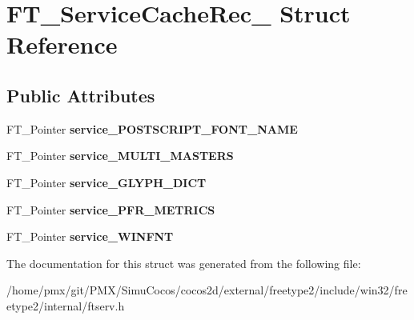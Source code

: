 \hypertarget{structFT__ServiceCacheRec__}{}\section{F\+T\+\_\+\+Service\+Cache\+Rec\+\_\+ Struct Reference}
\label{structFT__ServiceCacheRec__}
\subsection*{Public Attributes}
\begin{DoxyCompactItemize}
\item 
\mbox{\label{structFT__ServiceCacheRec___a1b95ee574621c8b031fe239d449bfa5c}} 
F\+T\+\_\+\+Pointer {\bfseries service\+\_\+\+P\+O\+S\+T\+S\+C\+R\+I\+P\+T\+\_\+\+F\+O\+N\+T\+\_\+\+N\+A\+ME}
\item 
\mbox{\label{structFT__ServiceCacheRec___abf51ac75b59eeac29ad5e4bbbc50e749}} 
F\+T\+\_\+\+Pointer {\bfseries service\+\_\+\+M\+U\+L\+T\+I\+\_\+\+M\+A\+S\+T\+E\+RS}
\item 
\mbox{\label{structFT__ServiceCacheRec___af8bbf442f497ad21666069ec33aaa88a}} 
F\+T\+\_\+\+Pointer {\bfseries service\+\_\+\+G\+L\+Y\+P\+H\+\_\+\+D\+I\+CT}
\item 
\mbox{\label{structFT__ServiceCacheRec___ac5d029d7f442e8b727c40d5a88faa344}} 
F\+T\+\_\+\+Pointer {\bfseries service\+\_\+\+P\+F\+R\+\_\+\+M\+E\+T\+R\+I\+CS}
\item 
\mbox{\label{structFT__ServiceCacheRec___abb824452cfb20932fbd22405323781f9}} 
F\+T\+\_\+\+Pointer {\bfseries service\+\_\+\+W\+I\+N\+F\+NT}
\end{DoxyCompactItemize}


The documentation for this struct was generated from the following file\+:\begin{DoxyCompactItemize}
\item 
/home/pmx/git/\+P\+M\+X/\+Simu\+Cocos/cocos2d/external/freetype2/include/win32/freetype2/internal/ftserv.\+h\end{DoxyCompactItemize}
